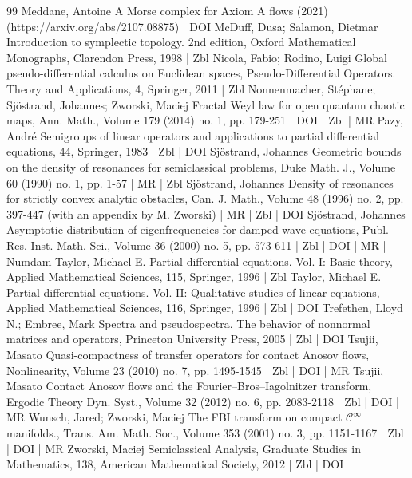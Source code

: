 \documentclass[10pt]{amsart}
\theoremstyle{definition}\newtheorem{defi}[theo]{Definition}\newtheorem{rema}[theo]{Remark}\newtheorem{exam}[theo]{Example}\newtheorem{exem}[theo]{Example}\newtheorem{nota}[theo]{Notation}
\begin{document}
\begin{thebibliography}{99}
Meddane, Antoine A Morse complex for Axiom A flows (2021) (https://arxiv.org/abs/2107.08875) | DOI
McDuff, Dusa; Salamon, Dietmar Introduction to symplectic topology. 2nd edition, Oxford Mathematical Monographs, Clarendon Press, 1998 | Zbl
Nicola, Fabio; Rodino, Luigi Global pseudo-differential calculus on Euclidean spaces, Pseudo-Differential Operators. Theory and Applications, 4, Springer, 2011 | Zbl
Nonnenmacher, Stéphane; Sjöstrand, Johannes; Zworski, Maciej Fractal Weyl law for open quantum chaotic maps, Ann. Math., Volume 179 (2014) no. 1, pp. 179-251 | DOI | Zbl | MR
Pazy, André Semigroups of linear operators and applications to partial differential equations, 44, Springer, 1983 | Zbl | DOI
Sjöstrand, Johannes Geometric bounds on the density of resonances for semiclassical problems, Duke Math. J., Volume 60 (1990) no. 1, pp. 1-57 | MR | Zbl
Sjöstrand, Johannes Density of resonances for strictly convex analytic obstacles, Can. J. Math., Volume 48 (1996) no. 2, pp. 397-447 (with an appendix by M. Zworski) | MR | Zbl | DOI
Sjöstrand, Johannes Asymptotic distribution of eigenfrequencies for damped wave equations, Publ. Res. Inst. Math. Sci., Volume 36 (2000) no. 5, pp. 573-611 | Zbl | DOI | MR | Numdam
Taylor, Michael E. Partial differential equations. Vol. I: Basic theory, Applied Mathematical Sciences, 115, Springer, 1996 | Zbl
Taylor, Michael E. Partial differential equations. Vol. II: Qualitative studies of linear equations, Applied Mathematical Sciences, 116, Springer, 1996 | Zbl | DOI
Trefethen, Lloyd N.; Embree, Mark Spectra and pseudospectra. The behavior of nonnormal matrices and operators, Princeton University Press, 2005 | Zbl | DOI
Tsujii, Masato Quasi-compactness of transfer operators for contact Anosov flows, Nonlinearity, Volume 23 (2010) no. 7, pp. 1495-1545 | Zbl | DOI | MR
Tsujii, Masato Contact Anosov flows and the Fourier–Bros–Iagolnitzer transform, Ergodic Theory Dyn. Syst., Volume 32 (2012) no. 6, pp. 2083-2118 | Zbl | DOI | MR
Wunsch, Jared; Zworski, Maciej The FBI transform on compact $\mathcal{C}^\infty $ manifolds., Trans. Am. Math. Soc., Volume 353 (2001) no. 3, pp. 1151-1167 | Zbl | DOI | MR
Zworski, Maciej Semiclassical Analysis, Graduate Studies in Mathematics, 138, American Mathematical Society, 2012 | Zbl | DOI
\end{thebibliography}
\end{document}

